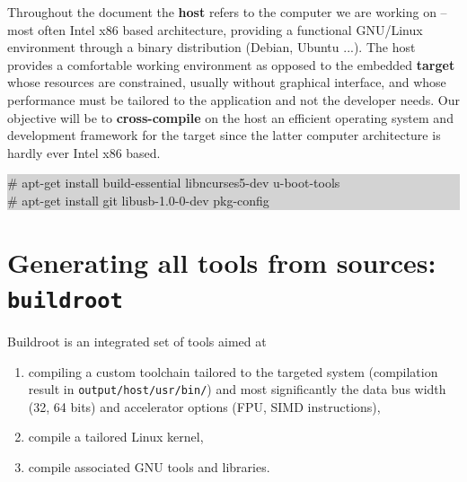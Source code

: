 \documentclass{article}
\begin{document}
Throughout the document the {\bf host} refers to the computer we are working on -- most often
Intel x86 based architecture, providing a functional GNU/Linux environment through a binary 
distribution (Debian, Ubuntu ...). The host provides a comfortable working environment as
opposed to the embedded {\bf target} whose resources are constrained, usually without graphical
interface, and whose performance must be tailored to the application and not the developer needs.
Our objective will be to {\bf cross-compile} on the host an efficient operating system and
development framework for the target since the latter computer architecture is hardly ever
Intel x86 based.

\colorbox{lightgray}{\begin{minipage}{0.9\textwidth}
\# apt-get install build-essential libncurses5-dev u-boot-tools \\
\# apt-get install git libusb-1.0-0-dev pkg-config 
\end{minipage}} 


\section{Generating all tools from sources: {\tt buildroot}}
\label{br}

Buildroot \cite{ficheux} is an integrated set of tools aimed at
\begin{enumerate}
\item compiling a custom toolchain tailored to the targeted system (compilation result in 
{\tt output/host/usr/bin/}) and most significantly the data bus width (32, 64 bits) and accelerator
options (FPU, SIMD instructions),
\item compile a tailored Linux kernel,
\item compile associated GNU tools and libraries.
\end{enumerate}
\end{document}
